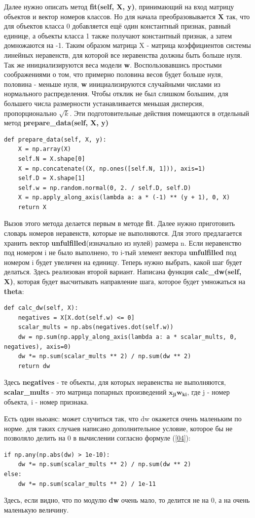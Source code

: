 \documentclass[a4paper]{article}
\begin{document}
Далее нужно описать метод \textbf{fit(self, X, y)}, принимающий на вход матрицу объектов и вектор номеров классов. Но для начала преобразовывается \textbf{X} так, что для объектов класса 0 добавляется ещё один константный признак, равный единице, а объекты класса 1 также получают константный признак, а затем домножаются на -1. Таким образом матрица X - матрица коэффициентов системы линейных неравенств, для которой все неравенства должны быть больше нуля. Так же инициализируются веса модели \textbf{w}. Воспользовавшись простыми соображениями о том, что примерно половина весов будет больше нуля, половина - меньше нуля, \textbf{w} инициализируются случайными числами из нормального распределения. Чтобы отклик не был слишком большим, для большего числа размерности устанавливается меньшая дисперсия, пропорционально $\sqrt{k}$. Эти подготовительные действия помещаются в отдельный метод \textbf{prepare\_data(self, X, y)}
\begin{lstlisting}
def prepare_data(self, X, y):
	X = np.array(X)
	self.N = X.shape[0]
	X = np.concatenate((X, np.ones([self.N, 1])), axis=1)
	self.D = X.shape[1]
	self.w = np.random.normal(0, 2. / self.D, self.D)
	X = np.apply_along_axis(lambda a: a * (-1) ** (y + 1), 0, X)
	return X
\end{lstlisting}

Вызов этого метода делается первым в методе \textbf{fit}. Далее нужно приготовить словарь номеров неравенств, которые не выполняются. Для этого предлагается хранить вектор \textbf{unfulfilled}(изначально из нулей) размера n. Если неравенство под номером i не было выполнено, то i-тый элемент вектора \textbf{unfulfilled} под номером i будет увеличен на единицу. Теперь нужно выбрать, какой шаг будет делаться. Здесь реализован второй вариант. Написана функция \textbf{calc\_dw(self, X)}, которая будет высчитывать направление шага, которое будет умножаться на \textbf{theta}:
\begin{lstlisting}
def calc_dw(self, X):
	negatives = X[X.dot(self.w) <= 0]
	scalar_mults = np.abs(negatives.dot(self.w))
	dw = np.sum(np.apply_along_axis(lambda a: a * scalar_mults, 0, negatives), axis=0)
 	dw *= np.sum(scalar_mults ** 2) / np.sum(dw ** 2)
 	return dw
\end{lstlisting}

Здесь \textbf{negatives} - те объекты, для которых неравенства не выполняются, \textbf{scalar\_mults} - это матрица попарных произведений $\bm{x_{ji}w_{ki}}$, где j - номер объекта, i - номер признака.

Есть один ньюанс: может случиться так, что dw окажется очень маленьким по норме. для таких случаев написано дополнительное условие, которое бы не позволяло делить на 0 в вычислении согласно формуле (\ref{04}):
\begin{lstlisting}
if np.any(np.abs(dw) > 1e-10):
	dw *= np.sum(scalar_mults ** 2) / np.sum(dw ** 2)
else:
	dw *= np.sum(scalar_mults ** 2) / 1e-11
\end{lstlisting}
Здесь, если видно, что по модулю \textbf{dw} очень мало, то делится не на 0, а на очень маленькую величину.
\end{document}
